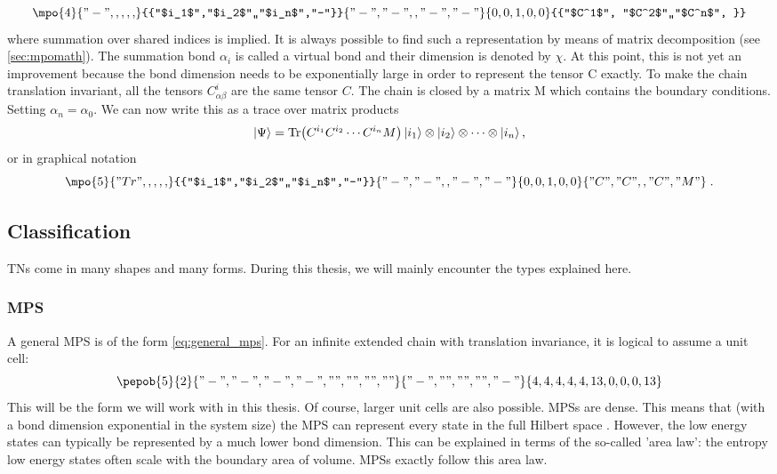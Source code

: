 \begin{equation}
    \mpo{4}{{"-",,,,,}}{{"$i_1$","$i_2$",,"$i_n$","-"}}{{"-","-",,"-","-"}}{{0,0,1,0,0}}{{"$C^1$", "$C^2$",,"$C^n$", }}
\end{equation}
where summation over shared indices is implied. It is always possible to find such a representation by means of matrix decomposition (see \cref{sec:mpomath}). The summation bond $\alpha_i$ is called a virtual bond and their dimension is denoted by $\chi$. At this point, this is not yet an improvement because the bond dimension needs to be exponentially large in order to represent the tensor C exactly. To make the chain translation invariant, all the tensors $C^i_{\alpha \beta }$ are the same tensor $C$. The chain is closed by a matrix M which contains the boundary conditions. Setting $\alpha_n = \alpha_0$. We can now write this as a trace over matrix products
\begin{equation}
    \ket{\Psi} = \Tr( C^{i_1} C^{i_2} \cdots C^{i_n} M  ) \ket{i_1} \otimes \ket{i_2} \otimes \cdots \otimes \ket{i_n},
\end{equation}
or in graphical notation
\begin{equation}\label{eq:general_mps}
    \mpo{5}{{"Tr",,,,,}}{{"$i_1$","$i_2$",,"$i_n$","-"}}{{"-","-",,"-","-"}}{{0,0,1,0,0}}{{"C", "C",,"C","M" }} \; .
\end{equation}

\subsection{Classification}

\Glspl{TN} come in many shapes and many forms. During this thesis, we will mainly encounter the types explained here.

\subsubsection{\Gls{MPS}}

A general \gls{MPS} is of the form \cref{eq:general_mps}. For an infinite extended chain with translation invariance, it is logical to assume a unit cell:
\begin{equation}\label{mps:uni}
    \pepob{5}{2}{{
                "-","-", "-","-",
                "","","",""}}{{
                "-",
                "",
                "",
                "",
                "-"}}{{
                4,4,4,4,4,
                13,0,0,0,13}}
\end{equation}
This will be the form we will work with in this thesis. Of course, larger unit cells are also possible. \Glspl{MPS} are dense. This means that (with a bond dimension exponential in the system size) the \Gls{MPS} can represent every state in the full Hilbert space \cite{Orus2014}. However, the low energy states can typically be represented by a much lower bond dimension. This can be explained in terms of the so-called 'area law': the entropy low energy states often scale with the boundary area of volume. \Glspl{MPS} exactly follow this area law.

